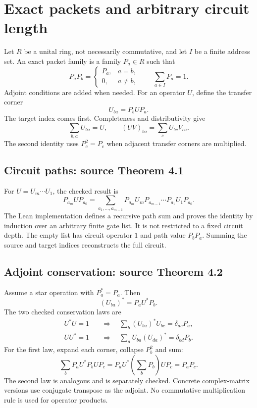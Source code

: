 \section{Exact packets and arbitrary circuit length}\label{supp1:section:001}
Let $R$ be a unital ring, not necessarily commutative, and let $I$ be a finite address set. An exact packet family is a family $P_a\in R$ such that
\[
P_aP_b=\begin{cases}P_a,&a=b,\\0,&a\ne b,\end{cases}
\qquad \sum_{a\in I}P_a=1.
\]
Adjoint conditions are added when needed. For an operator $U$, define the transfer corner
\[
U_{ba}=P_bUP_a.
\]
The target index comes first. Completeness and distributivity give
\[
\sum_{b,a}U_{ba}=U,\qquad
(UV)_{ba}=\sum_c U_{bc}V_{ca}.
\]
The second identity uses $P_c^2=P_c$ when adjacent transfer corners are multiplied.

\subsection{Circuit paths: source Theorem 4.1}
For $U=U_m\cdots U_1$, the checked result is
\[
P_{a_m}UP_{a_0}
=\sum_{a_1,\ldots,a_{m-1}}
P_{a_m}U_mP_{a_{m-1}}\cdots P_{a_1}U_1P_{a_0}.
\]
The Lean implementation defines a recursive path sum and proves the identity by induction over an arbitrary finite gate list. It is not restricted to a fixed circuit depth. The empty list has circuit operator $1$ and path value $P_bP_a$. Summing the source and target indices reconstructs the full circuit.



\subsection{Adjoint conservation: source Theorem 4.2}
Assume a star operation with $P_a^*=P_a$. Then
\[
(U_{ba})^*=P_aU^*P_b.
\]
The two checked conservation laws are
\begin{align*}
U^*U=1&\quad\Longrightarrow\quad
\sum_b(U_{ba})^*U_{bc}=\delta_{ac}P_a,\\
UU^*=1&\quad\Longrightarrow\quad
\sum_aU_{ba}(U_{da})^*=\delta_{bd}P_b.
\end{align*}
For the first law, expand each corner, collapse $P_b^2$ and sum:
\[
\sum_bP_aU^*P_bUP_c
=P_aU^*\left(\sum_bP_b\right)UP_c=P_aP_c.
\]
The second law is analogous and is separately checked. Concrete complex-matrix versions use conjugate transpose as the adjoint. No commutative multiplication rule is used for operator products.





